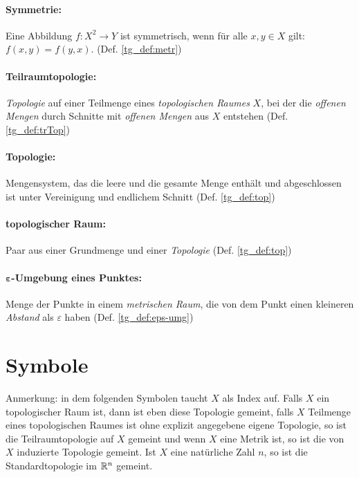     \paragraph{Symmetrie:} Eine Abbildung $f:X^2 \to Y$ ist symmetrisch, wenn für alle $x,y \in X$ gilt: $f(x,y) = f(y,x)$. (Def. \ref{tg_def:metr})
    
    \paragraph{Teilraumtopologie:} \textit{Topologie} auf einer Teilmenge eines \textit{topologischen Raumes} $X$, bei der die \textit{offenen Mengen} durch Schnitte mit \textit{offenen Mengen} aus $X$ entstehen (Def. \ref{tg_def:trTop})

    \paragraph{Topologie:} Mengensystem, das die leere und die gesamte Menge enthält und abgeschlossen ist unter Vereinigung und endlichem Schnitt (Def. \ref{tg_def:top})

    \paragraph{topologischer Raum:} Paar aus einer Grundmenge und einer \textit{Topologie} (Def. \ref{tg_def:top})
    
    \paragraph{$\boldsymbol{\varepsilon}$-Umgebung eines Punktes:} Menge der Punkte in einem \textit{metrischen Raum}, die von dem Punkt einen kleineren \textit{Abstand} als $\varepsilon$ haben (Def. \ref{tg_def:eps-umg})

\section*{Symbole}

    Anmerkung: in dem folgenden Symbolen taucht $X$ als Index auf. Falls $X$ ein topologischer Raum ist, dann ist eben diese Topologie gemeint, falls $X$ Teilmenge eines topologischen Raumes ist ohne explizit angegebene eigene Topologie, so ist die Teilraumtopologie auf $X$ gemeint und wenn $X$ eine Metrik ist, so ist die von $X$ induzierte Topologie gemeint. Ist $X$ eine natürliche Zahl $n$, so ist die Standardtopologie im $\mathbb{R}^n$ gemeint.
    
